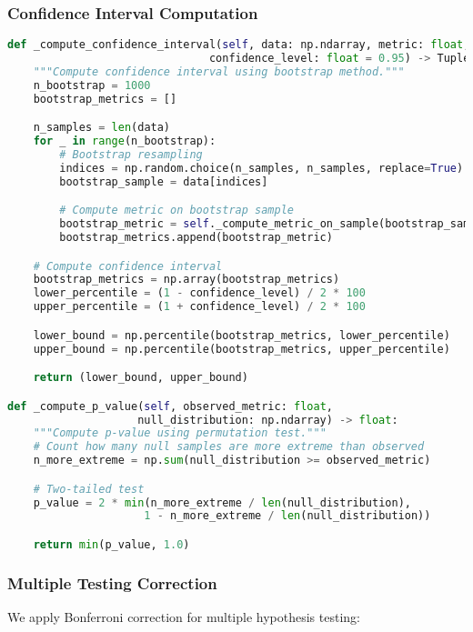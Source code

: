 \subsubsection{Confidence Interval Computation}

\begin{lstlisting}[language=Python, caption=Statistical validation]
def _compute_confidence_interval(self, data: np.ndarray, metric: float,
                               confidence_level: float = 0.95) -> Tuple[float, float]:
    """Compute confidence interval using bootstrap method."""
    n_bootstrap = 1000
    bootstrap_metrics = []

    n_samples = len(data)
    for _ in range(n_bootstrap):
        # Bootstrap resampling
        indices = np.random.choice(n_samples, n_samples, replace=True)
        bootstrap_sample = data[indices]

        # Compute metric on bootstrap sample
        bootstrap_metric = self._compute_metric_on_sample(bootstrap_sample)
        bootstrap_metrics.append(bootstrap_metric)

    # Compute confidence interval
    bootstrap_metrics = np.array(bootstrap_metrics)
    lower_percentile = (1 - confidence_level) / 2 * 100
    upper_percentile = (1 + confidence_level) / 2 * 100

    lower_bound = np.percentile(bootstrap_metrics, lower_percentile)
    upper_bound = np.percentile(bootstrap_metrics, upper_percentile)

    return (lower_bound, upper_bound)

def _compute_p_value(self, observed_metric: float,
                    null_distribution: np.ndarray) -> float:
    """Compute p-value using permutation test."""
    # Count how many null samples are more extreme than observed
    n_more_extreme = np.sum(null_distribution >= observed_metric)

    # Two-tailed test
    p_value = 2 * min(n_more_extreme / len(null_distribution),
                     1 - n_more_extreme / len(null_distribution))

    return min(p_value, 1.0)
\end{lstlisting}

\subsubsection{Multiple Testing Correction}

We apply Bonferroni correction for multiple hypothesis testing:

